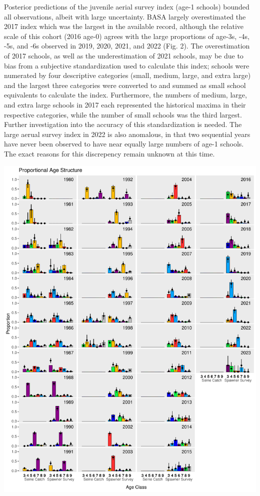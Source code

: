 \documentclass[
  11pt,
]{article}
\begin{document}
Posterior predictions of the juvenile aerial survey index (age-1
schools) bounded all observations, albeit with large uncertainty. BASA
largely overestimated the 2017 index which was the largest in the
available record, although the relative scale of this cohort (2016
age-0) agrees with the large proportions of age-3s, -4s, -5s, and -6s
observed in 2019, 2020, 2021, and 2022 (Fig. 2). The overestimation of
2017 schools, as well as the underestimation of 2021 schools, may be due
to bias from a subjective standardization used to calculate this index;
schools were numerated by four descriptive categories (small, medium,
large, and extra large) and the largest three categories were converted
to and summed as small school equivalents to calculate the index.
Furthermore, the numbers of medium, large, and extra large schools in
2017 each represented the historical maxima in their respective
categories, while the number of small schools was the third largest.
Further investigation into the accuracy of this standardization is
needed. The large aerual survey index in 2022 is also anomalous, in that
two sequential years have never been observed to have near equally large
numbers of age-1 schools. The exact reasons for this discrepency remain
unknown at this time.

\begin{center}\includegraphics[width=0.85\linewidth]{figures/age_compositions} \end{center}
\end{document}
